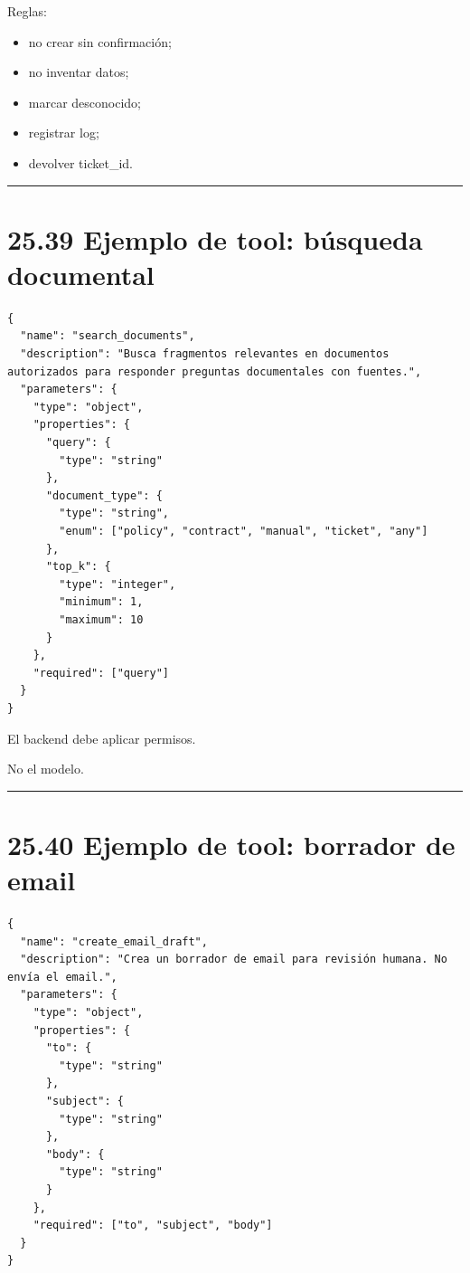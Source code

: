 Reglas:

\begin{itemize}
\tightlist
\item
  no crear sin confirmación;
\item
  no inventar datos;
\item
  marcar desconocido;
\item
  registrar log;
\item
  devolver ticket\_id.
\end{itemize}

\begin{center}\rule{0.5\linewidth}{0.5pt}\end{center}

\section{25.39 Ejemplo de tool: búsqueda
documental}\label{ejemplo-de-tool-buxfasqueda-documental}

\begin{lstlisting}
{
  "name": "search_documents",
  "description": "Busca fragmentos relevantes en documentos autorizados para responder preguntas documentales con fuentes.",
  "parameters": {
    "type": "object",
    "properties": {
      "query": {
        "type": "string"
      },
      "document_type": {
        "type": "string",
        "enum": ["policy", "contract", "manual", "ticket", "any"]
      },
      "top_k": {
        "type": "integer",
        "minimum": 1,
        "maximum": 10
      }
    },
    "required": ["query"]
  }
}
\end{lstlisting}

El backend debe aplicar permisos.

No el modelo.

\begin{center}\rule{0.5\linewidth}{0.5pt}\end{center}

\section{25.40 Ejemplo de tool: borrador de
email}\label{ejemplo-de-tool-borrador-de-email}

\begin{lstlisting}
{
  "name": "create_email_draft",
  "description": "Crea un borrador de email para revisión humana. No envía el email.",
  "parameters": {
    "type": "object",
    "properties": {
      "to": {
        "type": "string"
      },
      "subject": {
        "type": "string"
      },
      "body": {
        "type": "string"
      }
    },
    "required": ["to", "subject", "body"]
  }
}
\end{lstlisting}

